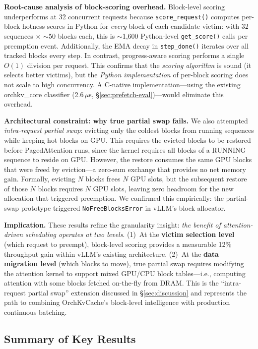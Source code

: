 \documentclass[conference]{IEEEtran}
\begin{document}
\textbf{Root-cause analysis of block-scoring overhead.} Block-level scoring underperforms at 32 concurrent requests because \texttt{score\_request()} computes per-block hotness scores in Python for \emph{every} block of each candidate victim: with 32 sequences $\times$ ${\sim}$50 blocks each, this is ${\sim}$1,600 Python-level \texttt{get\_score()} calls per preemption event. Additionally, the EMA decay in \texttt{step\_done()} iterates over all tracked blocks every step. In contrast, progress-aware scoring performs a single $O(1)$ division per request. This confirms that the \emph{scoring algorithm} is sound (it selects better victims), but the \emph{Python implementation} of per-block scoring does not scale to high concurrency. A C-native implementation---using the existing orchkv\_core classifier (2.6\,$\mu$s, \S\ref{sec:prefetch-eval})---would eliminate this overhead.

\textbf{Architectural constraint: why true partial swap fails.} We also attempted \emph{intra-request partial swap}: evicting only the coldest blocks from running sequences while keeping hot blocks on GPU. This requires the evicted blocks to be restored before PagedAttention runs, since the kernel requires all blocks of a RUNNING sequence to reside on GPU. However, the restore consumes the same GPU blocks that were freed by eviction---a zero-sum exchange that provides no net memory gain. Formally, evicting $N$ blocks frees $N$ GPU slots, but the subsequent restore of those $N$ blocks requires $N$ GPU slots, leaving zero headroom for the new allocation that triggered preemption. We confirmed this empirically: the partial-swap prototype triggered \texttt{NoFreeBlocksError} in vLLM's block allocator.

\textbf{Implication.} These results refine the granularity insight: \emph{the benefit of attention-driven scheduling operates at two levels}. (1)~At the \textbf{victim selection level} (which request to preempt), block-level scoring provides a measurable 12\% throughput gain within vLLM's existing architecture. (2)~At the \textbf{data migration level} (which blocks to move), true partial swap requires modifying the attention kernel to support mixed GPU/CPU block tables---i.e., computing attention with some blocks fetched on-the-fly from DRAM. This is the ``intra-request partial swap'' extension discussed in \S\ref{sec:discussion} and represents the path to combining OrchKvCache's block-level intelligence with production continuous batching.

\subsection{Summary of Key Results}
\end{document}
